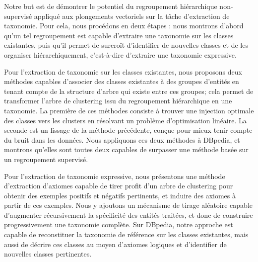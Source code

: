 Notre but est de démontrer le potentiel du regroupement hiérarchique non-supervisé appliqué aux plongements vectoriels sur la tâche d'extraction de taxonomie.
Pour cela, nous procédons en deux étapes : nous montrons d'abord qu'un tel regroupement est capable d'extraire une taxonomie sur les classes existantes, puis qu'il permet de surcroît d'identifier de nouvelles classes et de les organiser hiérarchiquement, c'est-à-dire d'extraire une taxonomie expressive.


Pour l'extraction de taxonomie sur les classes existantes, nous proposons deux méthodes capables d'associer des classes existantes à des groupes d'entités en tenant compte de la structure d'arbre qui existe entre ces groupes; cela permet de transformer l'arbre de clustering issu du regroupement hiérarchique en une taxonomie. La première de ces méthodes consiste à trouver une injection optimale des classes vers les clusters en résolvant un problème d'optimisation linéaire. La seconde est un lissage de la méthode précédente, conçue pour mieux tenir compte du bruit dans les données. Nous appliquons ces deux méthodes à DBpedia, et montrons qu'elles sont toutes deux capables de surpasser une méthode basée sur un regroupement supervisé.

Pour l'extraction de taxonomie expressive, nous présentons une méthode d'extraction d'axiomes capable de tirer profit d'un arbre de clustering pour obtenir des exemples positifs et négatifs pertinents, et induire des axiomes à partir de ces exemples. Nous y ajoutons un mécanisme de tirage aléatoire capable d'augmenter récursivement la spécificité des entités traitées, et donc de construire progressivement une taxonomie complète. Sur DBpedia, notre approche est capable de reconstituer la taxonomie de référence sur les classes existantes, mais aussi de décrire ces classes au moyen d'axiomes logiques et d'identifier de nouvelles classes pertinentes.










